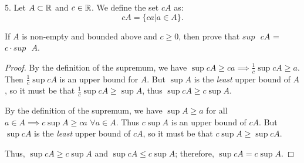 5. Let $A \subset \mathbb{R}$ and $c \in \mathbb{R}$. We define the set $cA$ as:
\[
	cA = \{ca | a \in A\}
.\] 

If $A$ is non-empty and bounded above and $c\ge 0$, then prove that $sup \text{ } cA$ = $c \cdot sup \text{ } A $.

\begin{proof}
	By the definition of the supremum, we have $\sup cA \ge ca \implies \frac{1}{c} \sup cA \ge a$. Then $\frac{1}{c} \sup cA$ is an upper bound for $A$. But $\sup A$ is the \textit{least} upper bound of $A$, so it must be that $\frac{1}{c} \sup cA\ge \sup A$, thus $\sup cA \ge c\sup A$.

	By the definition of the supremum, we have $\sup A \ge a$ for all $a \in A \implies c \sup A \ge ca$ $\forall a \in A$. Thus $c \sup A$ is an upper bound of  $cA$. But $\sup cA$ is the \textit{least} upper bound of $cA$, so it must be that $c \sup A \ge \sup cA$.

	Thus, $\sup cA \ge c \sup A$ and $\sup cA \le c \sup A$; therefore, $\sup cA = c \sup A$. 
\end{proof}






